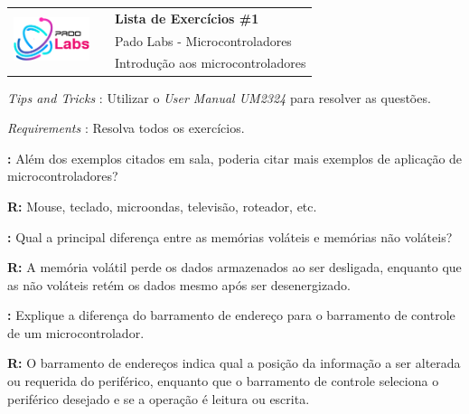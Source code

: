 
\setcounter{idx}{1}

\newcommand{\question}[1]{ 

    \textbf{\theidx : }#1
    \stepcounter{idx}
}

\newcommand{\answer}[1]{

    \ifanswers
    {
        \scriptsize\color{purple}\textbf{R:} #1
    }
    \else
    \vspace{1cm}
    \fi 
}

\begin{tabular}{l|ll}
    \multirow{3}{*}{\includegraphics[width=84px]{fig/logo.png}} & { } & {\LARGE \textbf{Lista de Exercícios \#1 }} \\
    & { } & {\Large Pado Labs - Microcontroladores} \\
    & { } & {Introdução aos microcontroladores}   
    \end{tabular}
    
    \vspace{0.5cm}
    \textit{Tips and Tricks} : Utilizar o \textit{User Manual UM2324} para resolver as questões.

    \textit{Requirements} : Resolva todos os exercícios.
    \vspace{0.5cm}

    \question{Além dos exemplos citados em sala, poderia citar mais exemplos de aplicação de microcontroladores?}

    \answer{Mouse, teclado, microondas, televisão, roteador, etc.}


    \question{Qual a principal diferença entre as memórias voláteis e memórias não voláteis?}

    \answer{A memória volátil perde os dados armazenados ao ser desligada, enquanto que as não voláteis retém os dados mesmo após ser desenergizado.}


    \question{Explique a diferença do barramento de endereço para o barramento de controle de um microcontrolador.}

    \answer{O barramento de endereços indica qual a posição da informação a ser alterada ou requerida do periférico, enquanto que o barramento de controle seleciona o periférico desejado e se a operação é leitura ou escrita.}

